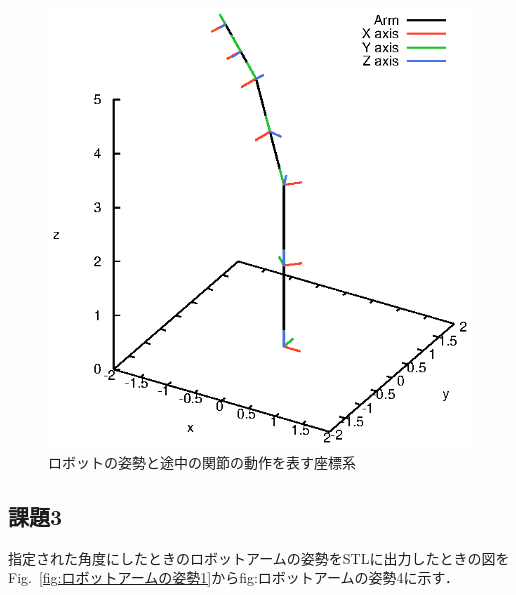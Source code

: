 \documentclass[a4paper,10pt]{jsarticle}
\begin{document}
\begin{figure}[b]
  \centering
  \includegraphics[width=140mm]{fig/eps/tf.eps}
  \caption{ロボットの姿勢と途中の関節の動作を表す座標系}
  \label{fig:ロボットの姿勢と途中の関節の動作を表す座標系}
\end{figure}

\subsection{課題3}
指定された角度にしたときのロボットアームの姿勢をSTLに出力したときの図をFig.~\ref{fig:ロボットアームの姿勢1}から{fig:ロボットアームの姿勢4}に示す．
\end{document}
